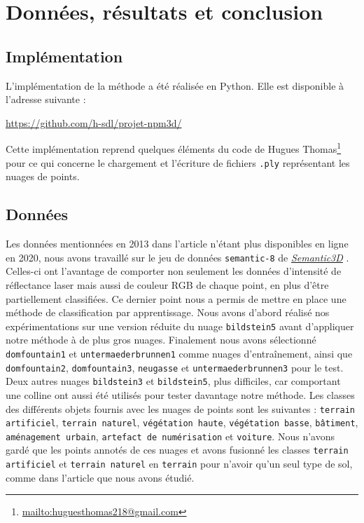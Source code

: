 \documentclass[a4paper, onecolumn, 11pt]{article}
\begin{document}
\section{Données, résultats et conclusion}
\subsection{Implémentation}
L'implémentation de la méthode a été réalisée en Python. Elle est disponible à l'adresse suivante :

\begin{center}
	\url{https://github.com/h-sdl/projet-npm3d/} 
\end{center}

Cette implémentation reprend quelques éléments du code de Hugues Thomas\footnote{\url{mailto:huguesthomas218@gmail.com}} pour ce qui concerne le chargement et l'écriture de fichiers \texttt{.ply} représentant les nuages de points.

\subsection{Données}
\label{partie-donnees}
Les données mentionnées en 2013 dans l'article \cite{aka_article} n'étant plus disponibles en ligne en 2020, nous avons travaillé sur le jeu de données \texttt{semantic-8} de \href{http://www.semantic3d.net/}{\emph{Semantic3D}} \cite{hackel2017isprs}. Celles-ci ont l'avantage de comporter non seulement les données d'intensité de réflectance laser mais aussi de couleur RGB de chaque point, en plus d'être partiellement classifiées. Ce dernier point nous a permis de mettre en place une méthode de classification par apprentissage.
Nous avons d'abord réalisé nos expérimentations sur une version réduite du nuage \texttt{bildstein5} avant d'appliquer notre méthode à de plus gros nuages. Finalement nous avons sélectionné \texttt{domfountain1} et \texttt{untermaederbrunnen1} comme nuages d'entraînement, ainsi que \texttt{domfountain2}, \texttt{domfountain3}, \texttt{neugasse} et \texttt{untermaederbrunnen3} pour le test. Deux autres nuages \texttt{bildstein3} et \texttt{bildstein5}, plus difficiles, car comportant une colline ont aussi été utilisés pour tester davantage notre méthode. Les classes des différents objets fournis avec les nuages de points sont les suivantes : \texttt{terrain artificiel}, \texttt{terrain naturel}, \texttt{végétation haute}, \texttt{végétation basse}, \texttt{bâtiment}, \texttt{aménagement urbain}, \texttt{artefact de numérisation} et \texttt{voiture}. Nous n'avons gardé que les points annotés de ces nuages et avons fusionné les classes \texttt{terrain artificiel} et \texttt{terrain naturel} en \texttt{terrain} pour n'avoir qu'un seul type de sol, comme dans l'article que nous avons étudié.
\end{document}
